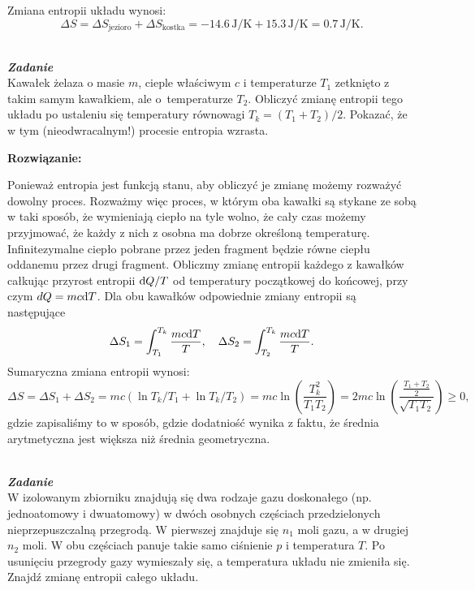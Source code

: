 \documentclass[11pt,a4paper]{article}
\renewcommand{\t}[1]{\textrm{#1}}
\renewcommand{\u}[1]{\,\textrm{#1}}
\newcommand{\dd}{{{\rm d}}}
\newcounter{zadanie}\newcommand{\zadanie}[1][]{\addtocounter{zadanie}{1} ~\\  {\bf \emph{Zadanie \arabic{zadanie} #1 }} \\}
\renewcommand{\t}[1]{\textrm{#1}}
\begin{document}
Zmiana entropii układu wynosi:
\begin{equation}
\Delta S = \Delta S_{\t{jezioro}} + \Delta S_{\t{kostka}} = -14.6 \u{J/K} + 15.3 \u{J/K} = 0.7 \u{J/K}.
\end{equation}


\newpage
\zadanie
Kawałek żelaza o masie $m$, cieple właściwym $c$ i temperaturze $T_1$ zetknięto
z takim samym kawałkiem, ale o~temperaturze $T_2$.
Obliczyć zmianę entropii tego układu po ustaleniu się temperatury
równowagi \mbox{$T_k = (T_1+T_2)/2$}. Pokazać, że w tym (nieodwracalnym!)
procesie entropia wzrasta.

\vskip 10pt
\noindent
\textbf{Rozwiązanie:}

Ponieważ entropia jest funkcją stanu, aby obliczyć je zmianę możemy  rozważyć dowolny proces. Rozważmy więc proces, w którym oba kawałki są stykane ze sobą w taki sposób, że wymieniają ciepło na tyle wolno, że cały czas możemy przyjmować, że każdy z nich z osobna ma dobrze określoną temperaturę. Infinitezymalne ciepło pobrane przez jeden fragment będzie równe ciepłu oddanemu przez drugi fragment. Obliczmy zmianę entropii każdego z kawałków całkując przyrost entropii $\dd Q/T$ od temperatury początkowej do końcowej, przy czym
$dQ = m c \dd T$. Dla obu kawałków odpowiednie zmiany entropii są następujące
\begin{equation}
\Delta S_1 = \int_{T_1}^{T_k} \frac{m c \dd T}{T}, \quad \Delta S_2 = \int_{T_2}^{T_k} \frac{m c \dd T}{T}.
\end{equation}
Sumaryczna zmiana entropii wynosi:
\begin{equation}
\Delta S = \Delta S_1+\Delta S_2 = m c \left( \ln T_k/T_1  + \ln T_k/T_2   \right) = m c \ln \left(\frac{T_k^2}{T_1 T_2}\right) =
2 m c \ln \left(\frac{\frac{T_1 + T_2}{2}}{\sqrt{T_1 T_2}}\right) \geq 0,
\end{equation}
gdzie zapisaliśmy to w sposób, gdzie dodatniość wynika z faktu, że średnia arytmetyczna jest większa niż średnia geometryczna.


\newpage
\zadanie
W izolowanym zbiorniku znajdują się dwa rodzaje gazu doskonałego (np. jednoatomowy i dwuatomowy)
w dwóch osobnych częściach przedzielonych nieprzepuszczalną przegrodą.
W pierwszej znajduje się $n_1$ moli gazu, a w drugiej $n_2$ moli.
W obu częściach panuje takie samo ciśnienie $p$ i temperatura $T$.
Po usunięciu przegrody gazy wymieszały się, a temperatura układu nie zmieniła się.
Znajdź zmianę entropii całego układu.
\newline
\end{document}
